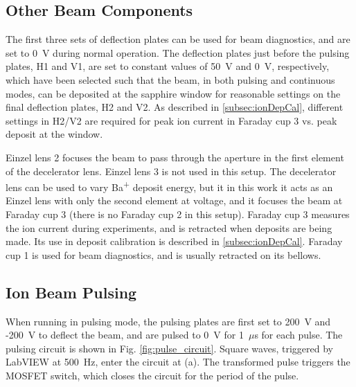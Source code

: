 \subsection{Other Beam Components}

The first three sets of deflection plates can be used for beam diagnostics, and are set to 0~V during normal operation.  The deflection plates just before the pulsing plates, H1 and V1, are set to constant values of 50~V and 0~V, respectively, which have been selected such that the beam, in both pulsing and continuous modes, can be deposited at the sapphire window for reasonable settings on the final deflection plates, H2 and V2.  As described in \ref{subsec:ionDepCal}, different settings in H2/V2 are required for peak ion current in Faraday cup 3 vs. peak deposit at the window.

Einzel lens 2 focuses the beam to pass through the aperture in the first element of the decelerator lens.  Einzel lens 3 is not used in this setup.  The decelerator lens can be used to vary Ba\textsuperscript{+} deposit energy, but it in this work it acts as an Einzel lens with only the second element at voltage, and it focuses the beam at Faraday cup 3 (there is no Faraday cup 2 in this setup).  Faraday cup 3 measures the ion current during experiments, and is retracted when deposits are being made.  Its use in deposit calibration is described in \ref{subsec:ionDepCal}.  Faraday cup 1 is used for beam diagnostics, and is usually retracted on its bellows.  

\subsection{Ion Beam Pulsing}

When running in pulsing mode, the pulsing plates are first set to 200~V and -200~V to deflect the beam, and are pulsed to 0~V for 1~$\mu$s for each pulse.  The pulsing circuit is shown in Fig. \ref{fig:pulse_circuit}.  Square waves, triggered by LabVIEW at 500~Hz, enter the circuit at (a). The transformed pulse triggers the MOSFET switch, which closes the circuit for the period of the pulse.

